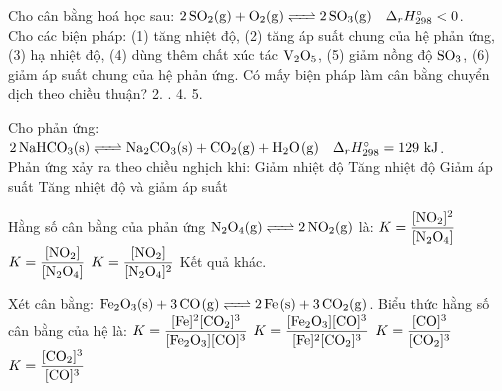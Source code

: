 \documentclass[12pt,a4paper]{article}
\begin{document}
\begin{ex}
Cho cân bằng hoá học sau: $\ce{2SO2(g) + O2(g) <=> 2SO3(g)} \quad \Delta_r H^\circ_{298} < 0$.\\
Cho các biện pháp: (1) tăng nhiệt độ, (2) tăng áp suất chung của hệ phản ứng, (3) hạ nhiệt độ, (4) dùng thêm chất xúc tác $\ce{V2O5}$, (5) giảm nồng độ $\ce{SO3}$, (6) giảm áp suất chung của hệ phản ứng. Có mấy biện pháp làm cân bằng chuyển dịch theo chiều thuận?
\choice
{2.}
{.}
{4.}
{5.}
\end{ex}

\begin{ex}
Cho phản ứng: $\ce{2NaHCO3(s) <=> Na2CO3(s) + CO2(g) + H2O(g)} \quad \Delta_r H^\circ_{298} = 129\text{ kJ}$.\\
Phản ứng xảy ra theo chiều nghịch khi:
\choice
{\True Giảm nhiệt độ}
{Tăng nhiệt độ}
{Giảm áp suất}
{Tăng nhiệt độ và giảm áp suất}
\end{ex}

\begin{ex}
Hằng số cân bằng của phản ứng $\ce{N2O4(g) <=> 2NO2(g)}$ là:
\choice
{\True $K = \dfrac{[\ce{NO2}]^2}{[\ce{N2O4}]}$}
{$K = \dfrac{[\ce{NO2}]}{[\ce{N2O4}]}$}
{$K = \dfrac{[\ce{NO2}]}{[\ce{N2O4}]^2}$}
{Kết quả khác.}
\end{ex}

\begin{ex}
Xét cân bằng: $\ce{Fe2O3(s) + 3CO(g) <=> 2Fe(s) + 3CO2(g)}$. Biểu thức hằng số cân bằng của hệ là:
\choice
{$K = \dfrac{[\ce{Fe}]^2 [\ce{CO2}]^3}{[\ce{Fe2O3}] [\ce{CO}]^3}$}
{$K = \dfrac{[\ce{Fe2O3}] [\ce{CO}]^3}{[\ce{Fe}]^2 [\ce{CO2}]^3}$}
{$K = \dfrac{[\ce{CO}]^3}{[\ce{CO2}]^3}$}
{\True $K = \dfrac{[\ce{CO2}]^3}{[\ce{CO}]^3}$}
\end{ex}
\end{document}
